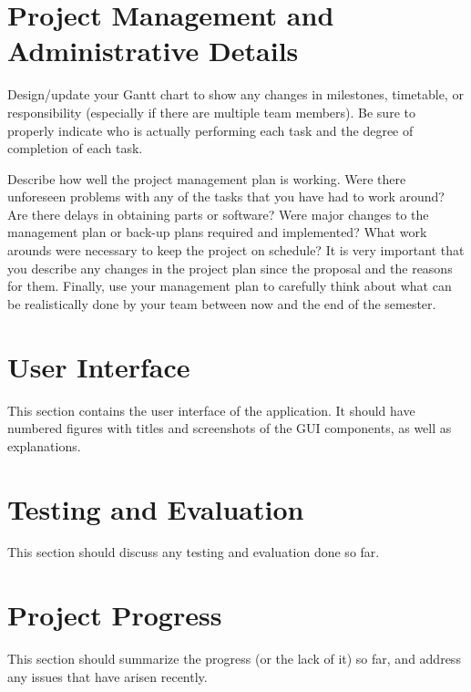 \documentclass[letterpaper,12pt]{article}
\begin{document}
\newpage



\section{Project Management and Administrative Details}
Design/update your Gantt chart to show any changes in milestones, timetable, or
responsibility (especially if there are multiple team members). Be sure to
properly indicate who is actually performing each task and the degree of
completion of each task.

Describe how well the project management plan is working. Were there unforeseen
problems with any of the tasks that you have had to work around? Are there
delays in obtaining parts or software? Were major changes to the management plan
or back-up plans required and implemented? What work arounds were necessary to
keep the project on schedule? It is very important that you describe any changes
in the project plan since the proposal and the reasons for them.
Finally, use your management plan to carefully think about what can be
realistically done by your team between now and the end of the semester.

\newpage



\section{User Interface}
This section contains the user interface of the application. It should have
numbered figures with titles and screenshots of the GUI components, as well as
explanations.

\newpage



\section{Testing and Evaluation}
This section should discuss any testing and evaluation done so far.

\newpage



\section{Project Progress}
This section should summarize the progress (or the lack of it) so far, and
address any issues that have arisen recently.

\newpage
\end{document}
